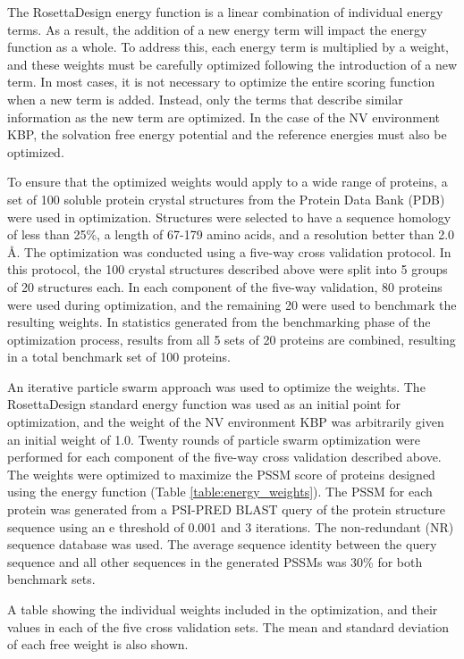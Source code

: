 The RosettaDesign energy function is a linear combination of individual energy terms.
As a result, the addition of a new energy term will impact the energy function as a whole.
To address this, each energy term is multiplied by a weight, and these weights must be carefully optimized following the introduction of a new term.
In most cases, it is not necessary to optimize the entire scoring function when a new term is added.
Instead, only the terms that describe similar information as the new term are optimized.
In the case of the NV environment KBP, the solvation free energy potential and the reference energies must also be optimized. 

To ensure that the optimized weights would apply to a wide range of proteins, a set of 100 soluble protein crystal structures from the Protein Data Bank (PDB) were used in optimization.
Structures were selected to have a sequence homology of less than 25\%, a length of 67-179 amino acids, and a resolution better than 2.0 \AA.
The optimization was conducted using a five-way cross validation protocol.
In this protocol, the 100 crystal structures described above were split into 5 groups of 20 structures each.
In each component of the five-way validation, 80 proteins were used during optimization, and the remaining 20 were used to benchmark the resulting weights.
In statistics generated from the benchmarking phase of the optimization process, results from all 5 sets of 20 proteins are combined, resulting in a total benchmark set of 100 proteins. 

An iterative particle swarm approach \citep{Chen:2007ua} was used to optimize the weights.
The RosettaDesign standard energy function was used as an initial point for optimization, and the weight of the NV environment KBP was arbitrarily given an initial weight of 1.0.
Twenty rounds of particle swarm optimization were performed for each component of the five-way cross validation described above.
The weights were optimized to maximize the PSSM score of proteins designed using the energy function (Table \ref{table:energy_weights}).
The PSSM for each protein was generated from a PSI-PRED BLAST query of the protein structure sequence using an e threshold of 0.001 and 3 iterations.
The non-redundant (NR) sequence database was used.
The average sequence identity between the query sequence and all other sequences in the generated PSSMs was 30\% for both benchmark sets.

\begin{table}
\scriptsize
\renewcommand{\tabcolsep}{0.09cm}
\centering

\caption{A table showing the individual weights included in the optimization, and their values in each of the five cross validation sets.  The mean and standard deviation of each free weight is also shown. }
\label{table:energy_weights}
\end{table}

